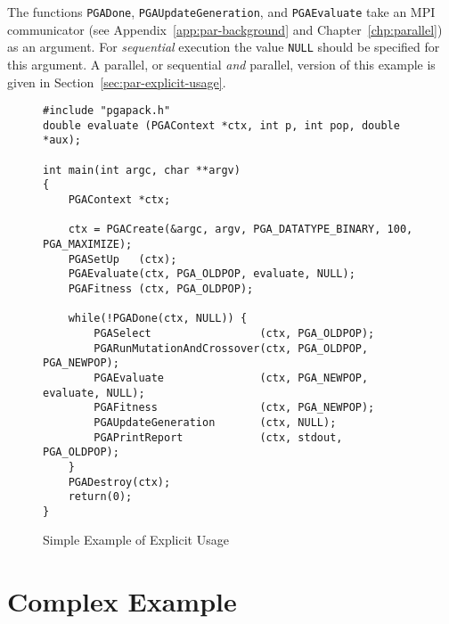 \documentclass{report}
\begin{document}
The functions {\tt PGADone}, {\tt PGAUpdateGeneration}, and {\tt PGAEvaluate}
take an MPI communicator (see Appendix~\ref{app:par-background} and
Chapter~\ref{chp:parallel}) as an argument.  For {\em sequential} execution
the value {\tt NULL} should be specified for this argument.
A parallel, or sequential {\em and} parallel, version of this example is given
in Section~\ref{sec:par-explicit-usage}.

\begin{figure}
\begin{verbatim}
#include "pgapack.h"
double evaluate (PGAContext *ctx, int p, int pop, double *aux);

int main(int argc, char **argv)
{
    PGAContext *ctx; 

    ctx = PGACreate(&argc, argv, PGA_DATATYPE_BINARY, 100, PGA_MAXIMIZE);
    PGASetUp   (ctx);
    PGAEvaluate(ctx, PGA_OLDPOP, evaluate, NULL);
    PGAFitness (ctx, PGA_OLDPOP);
    
    while(!PGADone(ctx, NULL)) {
        PGASelect                 (ctx, PGA_OLDPOP);
        PGARunMutationAndCrossover(ctx, PGA_OLDPOP, PGA_NEWPOP);
        PGAEvaluate               (ctx, PGA_NEWPOP, evaluate, NULL);
        PGAFitness                (ctx, PGA_NEWPOP);
        PGAUpdateGeneration       (ctx, NULL);
        PGAPrintReport            (ctx, stdout, PGA_OLDPOP);
    }
    PGADestroy(ctx);
    return(0);
}
\end{verbatim}
\caption{Simple Example of Explicit Usage}
\label{simple-example}
\end{figure}


\section{Complex Example}
\end{document}
